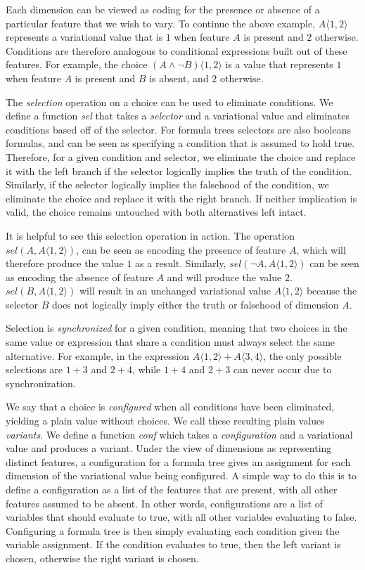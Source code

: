 \documentclass[12pt,oneside]{book}
\newcommand{\tagtree}[3]{#1 \langle #2, #3 \rangle}
\begin{document}
Each dimension can be viewed as coding for the presence or absence of a
particular feature that we wish to vary. To continue the above example, $\tagtree{A}{1}{2}$
represents a variational value that is $1$ when feature $A$ is present and $2$ otherwise. Conditions
are therefore analogous to conditional expressions built out of these features. For example, the choice $\tagtree{(A \wedge \neg B)}{1}{2}$
is a value that represents $1$ when feature $A$ is present and $B$ is absent, and $2$ otherwise.

The \emph{selection} operation on a choice can be used to eliminate conditions. We define a function
\emph{sel} that takes a \emph{selector} and a variational value and eliminates conditions based off
of the selector. For formula trees selectors are also booleans formulas, and can be seen as specifying
a condition that is assumed to hold true. Therefore, for a given condition and
selector, we eliminate the choice and replace it with the left branch if the selector logically implies
the truth of the condition. Similarly, if the selector logically implies the falsehood of the condition, we eliminate the choice
and replace it with the right branch. If neither implication is valid, the choice remains untouched with
both alternatives left intact.

It is helpful to see this selection operation in action. The operation
$\mathit{sel}(A,\tagtree{A}{1}{2})$, can be seen as encoding the presence of feature $A$, which
will therefore produce the value $1$ as a result. Similarly, $\mathit{sel}(\neg A,\tagtree{A}{1}{2})$ can be seen as encoding the absence of feature $A$ and will
produce the value $2$. $\mathit{sel}(B,\tagtree{A}{1}{2})$ will result in an unchanged variational
value $\tagtree{A}{1}{2}$ because the selector $B$ does not logically imply either the truth or falsehood
of dimension $A$.

Selection is \emph{synchronized} for a given
condition, meaning that two choices in the same value or expression that share a condition must always
select the same alternative. For example, in the expression $\tagtree{A}{1}{2}+\tagtree{A}{3}{4}$,
the only possible selections are $1+3$ and $2+4$, while $1+4$ and $2+3$ can never occur due
to synchronization.

We say that a choice is \emph{configured} when all conditions
have been eliminated, yielding a plain value without choices. We call these resulting plain values
\emph{variants}. We define a function \emph{conf} which takes a
\emph{configuration} and a variational value and produces a variant. Under the view of dimensions as representing distinct features, a configuration for a formula tree gives
an assignment for each dimension of the variational value being configured.
A simple way to do this is to define a configuration as a list of the features that are present, with all
other features assumed to be absent. In other words, configurations are a list of variables that should
evaluate to true, with all other variables evaluating to false. Configuring a formula tree is then simply evaluating
each condition given the variable assignment. If the condition evaluates to true, then the left variant
is chosen, otherwise the right variant is chosen.
\end{document}

